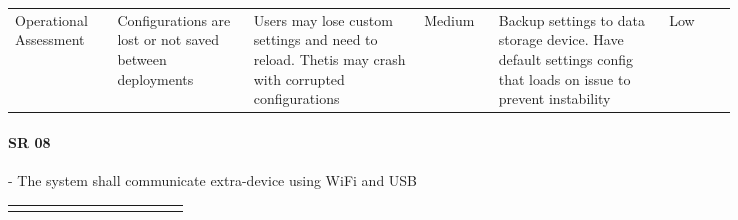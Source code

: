 \begin{landscape}
{\begin{longtable}{| p{0.12\linewidth} | p{0.16\linewidth} |  p{0.20\linewidth} | p{0.08\linewidth} | p{0.20\linewidth} | p{0.08\linewidth} |}
	Operational \newline Assessment & Configurations are lost or not saved between deployments & Users may lose custom settings and need to reload. \newline Thetis may crash with corrupted configurations  & \cellcolor{yellow} Medium & Backup settings to data storage device. \newline Have default settings config that loads on issue to prevent instability & \cellcolor{green} Low
	\label{tab:sr07_feasibility}
\end{longtable}
}
\newpage




\paragraph*{SR 08} - The system shall communicate extra-device using WiFi and USB 

{\fontsize{8pt}{8pt}\selectfont
\begin{longtable}{| p{0.12\linewidth} | p{0.16\linewidth} |  p{0.20\linewidth} | p{0.08\linewidth} | p{0.20\linewidth} | p{0.08\linewidth} |}
	\hline \endlastfoot
	

\end{longtable}}
\end{landscape}
